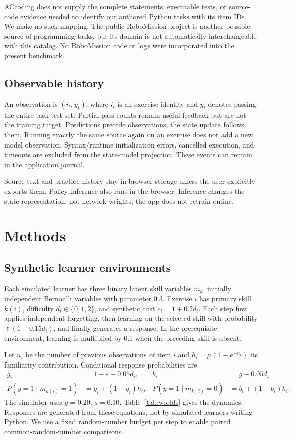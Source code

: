 \documentclass[11pt,a4paper]{article}
\begin{document}
ACcoding does not supply the complete statements, executable tests, or source-code evidence needed to identify our authored Python tasks with its item IDs. We make no such mapping. The public RoboMission project is another possible source of programming tasks, but its domain is not automatically interchangeable with this catalog. No RoboMission code or logs were incorporated into the present benchmark.

\subsection{Observable history}
An observation is $(i_t,y_t)$, where $i_t$ is an exercise identity and $y_t$ denotes passing the entire task test set. Partial pass counts remain useful feedback but are not the training target. Predictions precede observations; the state update follows them. Running exactly the same source again on an exercise does not add a new model observation. Syntax/runtime initialization errors, cancelled execution, and timeouts are excluded from the state-model projection. These events can remain in the application journal.

Source text and practice history stay in browser storage unless the user explicitly exports them. Policy inference also runs in the browser. Inference changes the state representation, not network weights; the app does not retrain online.

\section{Methods}
\subsection{Synthetic learner environments}
Each simulated learner has three binary latent skill variables $m_k$, initially independent Bernoulli variables with parameter 0.3. Exercise $i$ has primary skill $k(i)$, difficulty $d_i\in\{0,1,2\}$, and synthetic cost $c_i=1+0.2d_i$. Each step first applies independent forgetting, then learning on the selected skill with probability $\ell(1+0.15d_i)$, and finally generates a response. In the prerequisite environment, learning is multiplied by 0.1 when the preceding skill is absent.

Let $n_i$ be the number of previous observations of item $i$ and $h_i=\mu(1-e^{-n_i})$ its familiarity contribution. Conditional response probabilities are
\begin{align}
g_i &= 1-s-0.05d_i, & b_i &= g-0.05d_i,\\
P(y=1\mid m_{k(i)}=1)&=g_i+(1-g_i)h_i, &
P(y=1\mid m_{k(i)}=0)&=b_i+(1-b_i)h_i.
\end{align}
The simulator uses $g=0.20$, $s=0.10$. Table~\ref{tab:worlds} gives the dynamics. Responses are generated from these equations, not by simulated learners writing Python. We use a fixed random-number budget per step to enable paired common-random-number comparisons.
\end{document}
